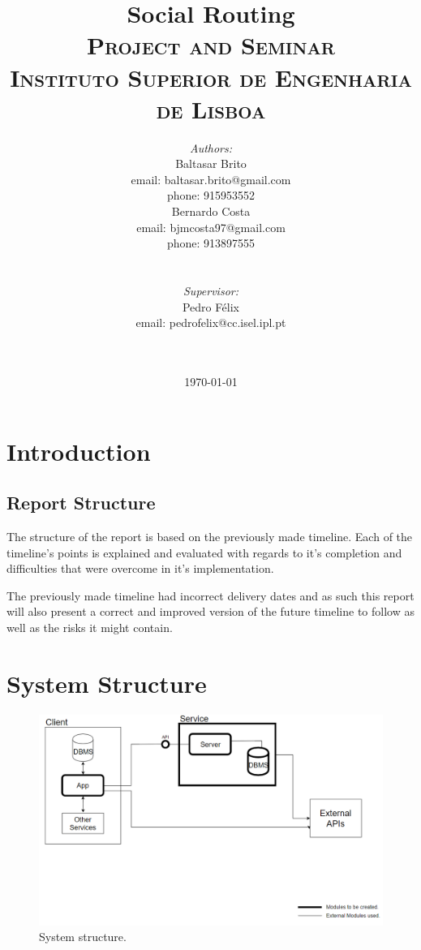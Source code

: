 \documentclass{article}
\title{
    \vspace{-4.0cm}
    {\Huge Social Routing}\\[0.5cm]    
    \textsc{\Large Project and Seminar}\\[0.5cm]
    \textsc{\large Instituto Superior de Engenharia de Lisboa}\\[0.5cm]
}
\date{\today}
\author{   
    \begin{minipage}{0.4\textwidth}
        \begin{flushleft} \large
        \emph{Authors:}\\
        Baltasar Brito\\
        {\small email: baltasar.brito@gmail.com}\\
        {\small phone: 915953552}\\
        Bernardo Costa\\
        {\small email: bjmcosta97@gmail.com}\\
        {\small phone: 913897555}\\
        \end{flushleft}
    \end{minipage}
    ~
    \begin{minipage}{0.4\textwidth}
        \begin{flushright} \large
        \emph{Supervisor:} \\ 
        Pedro Félix\\
        {\small email: pedrofelix@cc.isel.ipl.pt}\\  
        \end{flushright}
    \end{minipage}\\[2cm]  
}
\begin{document}
     
    
    \maketitle

    \newpage

    \tableofcontents

    \newpage

    \section{Introduction}
    
        \subsection*{Report Structure}
        The structure of the report is based on the previously made timeline. Each of the timeline's points is explained and evaluated with regards to it's completion and difficulties that were overcome in it's implementation.\par
        The previously made timeline had incorrect delivery dates and as such this report will also present a correct and improved version of the future timeline to follow as well as the risks it might contain.
    
        \newpage
    
    \section{System Structure}
        \begin{figure}[h]            
            \includegraphics[width=\textwidth]{images/project-structure/system-structure.PNG}
            \caption{System structure.}
            \label{fig:systemstructure}
        \end{figure}  
        \newpage
\end{document}
